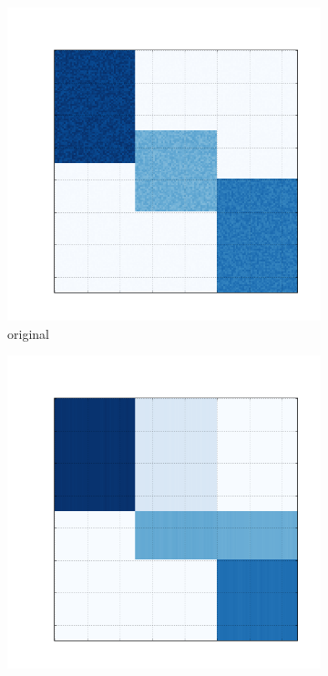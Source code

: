 \documentclass[10pt]{beamer}
\begin{document}
\begin{frame}
\begin{figure}[H]
      \begin{subfigure}[b]{0.13\textwidth}
          \includegraphics[width=\textwidth]{img/e-bic-structure.png}
          \caption*{original}
      \end{subfigure}
      \begin{subfigure}[b]{0.13\textwidth}
          \includegraphics[width=\textwidth]{img/e-reconstruction-kmeans.png}

\end{subfigure}
\end{figure}
\end{frame}
\end{document}
